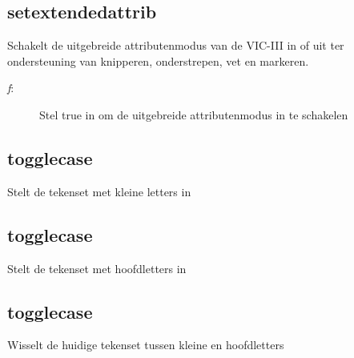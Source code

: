 \subsection{setextendedattrib}
\begin{description}[leftmargin=2.4cm,style=nextline]
\item [Beschrijving:] {Schakelt de uitgebreide   attributenmodus van de VIC-III in of uit ter ondersteuning van knipperen, onderstrepen, vet en markeren.}\item [Syntaxis:] \item [Parameters:]
\begin{description}
\item [{\em f}:] {Stel true in om de uitgebreide attributenmodus in te schakelen}
\end{description}
\end{description}

\subsection{togglecase}
\begin{description}[leftmargin=2.4cm,style=nextline]
\item [Beschrijving:] {Stelt de tekenset met kleine letters in}\item [Syntaxis:] 
\end{description}

\subsection{togglecase}
\begin{description}[leftmargin=2.4cm,style=nextline]
\item [Beschrijving:] {Stelt de tekenset met hoofdletters in}\item [Syntaxis:] 
\end{description}

\subsection{togglecase}
\begin{description}[leftmargin=2.4cm,style=nextline]
\item [Beschrijving:] {Wisselt de huidige tekenset tussen kleine en hoofdletters}\item [Syntaxis:] 
\end{description}

